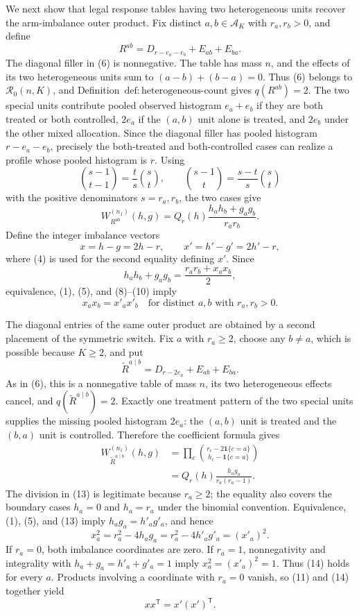 We next show that legal response tables having two heterogeneous units recover the arm-imbalance outer product.  Fix distinct \(a,b\in\mathcal A_K\) with \(r_a,r_b>0\), and define
\[
 R^{ab}=D_{r-e_a-e_b}+E_{ab}+E_{ba}.
 \tag{6}
\]
The diagonal filler in (6) is nonnegative.  The table has mass \(n\), and the effects of its two heterogeneous units sum to \((a-b)+(b-a)=0\).  Thus (6) belongs to \(\mathcal R_0(n,K)\), and Definition~\(\mathrm{def:heterogeneous\mbox{-}count}\) gives \(q(R^{ab})=2\).  The two special units contribute pooled observed histogram \(e_a+e_b\) if they are both treated or both controlled, \(2e_a\) if the \((a,b)\) unit alone is treated, and \(2e_b\) under the other mixed allocation.  Since the diagonal filler has pooled histogram \(r-e_a-e_b\), precisely the both-treated and both-controlled cases can realize a profile whose pooled histogram is \(r\).  Using
\[
 \binom{s-1}{t-1}=\frac{t}{s}\binom{s}{t},
 \qquad
 \binom{s-1}{t}=\frac{s-t}{s}\binom{s}{t}
 \tag{7}
\]
with the positive denominators \(s=r_a,r_b\), the two cases give
\[
 W_{R^{ab}}^{(n_1)}(h,g)
 =Q_r(h)\frac{h_ah_b+g_ag_b}{r_ar_b}.
 \tag{8}
\]
Define the integer imbalance vectors
\[
 x=h-g=2h-r,
 \qquad
 x'=h'-g'=2h'-r,
 \tag{9}
\]
where (4) is used for the second equality defining \(x'\).  Since
\[
 h_ah_b+g_ag_b=\frac{r_ar_b+x_ax_b}{2},
 \tag{10}
\]
equivalence, (1), (5), and (8)--(10) imply
\[
 x_ax_b=x'_ax'_b
 \quad\text{for distinct }a,b\text{ with }r_a,r_b>0.
 \tag{11}
\]

The diagonal entries of the same outer product are obtained by a second placement of the symmetric switch.  Fix \(a\) with \(r_a\geq2\), choose any \(b\neq a\), which is possible because \(K\geq2\), and put
\[
 \widetilde R^{a\mid b}=D_{r-2e_a}+E_{ab}+E_{ba}.
 \tag{12}
\]
As in (6), this is a nonnegative table of mass \(n\), its two heterogeneous effects cancel, and \(q(\widetilde R^{a\mid b})=2\).  Exactly one treatment pattern of the two special units supplies the missing pooled histogram \(2e_a\): the \((a,b)\) unit is treated and the \((b,a)\) unit is controlled.  Therefore the coefficient formula gives
\[
 \begin{aligned}
 W_{\widetilde R^{a\mid b}}^{(n_1)}(h,g)
 &=\prod_c\binom{r_c-2\mathbf 1\{c=a\}}
                         {h_c-\mathbf 1\{c=a\}}\\
 &=Q_r(h)\frac{h_ag_a}{r_a(r_a-1)}.
 \end{aligned}
 \tag{13}
\]
The division in (13) is legitimate because \(r_a\geq2\); the equality also covers the boundary cases \(h_a=0\) and \(h_a=r_a\) under the binomial convention.  Equivalence, (1), (5), and (13) imply \(h_ag_a=h'_ag'_a\), and hence
\[
 x_a^2=r_a^2-4h_ag_a=r_a^2-4h'_ag'_a=(x'_a)^2.
 \tag{14}
\]
If \(r_a=0\), both imbalance coordinates are zero.  If \(r_a=1\), nonnegativity and integrality with \(h_a+g_a=h'_a+g'_a=1\) imply \(x_a^2=(x'_a)^2=1\).  Thus (14) holds for every \(a\).  Products involving a coordinate with \(r_a=0\) vanish, so (11) and (14) together yield
\[
 xx^{\mathsf T}=x'(x')^{\mathsf T}.
 \tag{15}
\]

